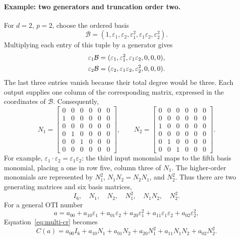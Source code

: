 \paragraph{Example: two generators and truncation order two.}
For $d=2$, $p=2$, choose the ordered basis
\[
 \mathcal B=(1,\varepsilon_1,\varepsilon_2,\varepsilon_1^2,
 \varepsilon_1\varepsilon_2,\varepsilon_2^2).
\]
Multiplying each entry of this tuple by a generator gives
\begin{align}
 \varepsilon_1\mathcal B
 &=(\varepsilon_1,\varepsilon_1^2,\varepsilon_1\varepsilon_2,0,0,0),
 \notag\\
 \varepsilon_2\mathcal B
 &=(\varepsilon_2,\varepsilon_1\varepsilon_2,\varepsilon_2^2,0,0,0).
 \label{eq:multi-basis-action}
\end{align}
The last three entries vanish because their total degree would be three.
Each output supplies one column of the corresponding matrix, expressed
in the coordinates of $\mathcal B$. Consequently,
\[
 N_1=\begin{bmatrix}
 0&0&0&0&0&0\\1&0&0&0&0&0\\0&0&0&0&0&0\\
 0&1&0&0&0&0\\0&0&1&0&0&0\\0&0&0&0&0&0
 \end{bmatrix},\qquad
 N_2=\begin{bmatrix}
 0&0&0&0&0&0\\0&0&0&0&0&0\\1&0&0&0&0&0\\
 0&0&0&0&0&0\\0&1&0&0&0&0\\0&0&1&0&0&0
 \end{bmatrix}.
\]
For example, $\varepsilon_1\cdot\varepsilon_2=\varepsilon_1\varepsilon_2$:
the third input monomial maps to the fifth basis monomial, placing a one
in row five, column three of $N_1$. The higher-order monomials are
represented by $N_1^2$, $N_1N_2=N_2N_1$, and $N_2^2$.
Thus there are two generating matrices and six basis matrices,
\[
 I_6,\quad N_1,\quad N_2,\quad N_1^2,\quad N_1N_2,\quad N_2^2.
\]
For a general OTI number
\[
 a=a_{00}+a_{10}\varepsilon_1+a_{01}\varepsilon_2+
 a_{20}\varepsilon_1^2+a_{11}\varepsilon_1\varepsilon_2+a_{02}\varepsilon_2^2,
\]
Equation~\eqref{eq:multi-cr} becomes
\begin{equation}
 \label{eq:multi-cr-generators}
 \boxed{C(a)=a_{00}I_6+a_{10}N_1+a_{01}N_2
 +a_{20}N_1^2+a_{11}N_1N_2+a_{02}N_2^2.}
\end{equation}
